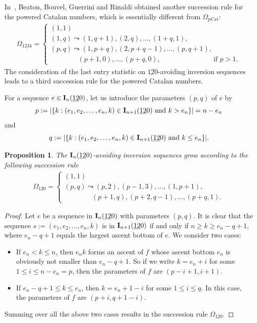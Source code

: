 \documentclass[12pt,A4]{amsart}
\numberwithin{equation}{section}
\theoremstyle{plain}
\newtheorem{proposition}[theorem]{Proposition}
\theoremstyle{definition}
\def\I{\operatorname{{\bf I}}}
\begin{document}
In~\cite[Prop.~25]{bbgr}, Beaton, Bouvel, Guerrini and Rinaldi obtained another succession rule for the powered Catalan numbers, which is essentially different from $\Omega_{\mathrm{pCat}}$:
\begin{align*}
\Omega_{\mathrm{1\underline{23}4}}=\begin{cases}
(1,1) \\
(1,q) \leadsto (1,q+1), (2,q),\ldots,(1+q,1),\\
(p,q)\leadsto (1,p+q), (2,p+q-1),\ldots,(p,q+1),\\
\qquad\qquad (p+1,0),\dots,(p+q,0),\qquad\qquad\qquad\,\,\,\,\quad\text{if $p>1$}.
\end{cases}
\end{align*} 
The consideration of the last entry statistic on $\underline{12}0$-avoiding inversion sequences leads to a third succession rule for the powered Catalan numbers. 

For a sequence $e\in\I_n(\underline{12}0)$, let us introduce the parameters $(p,q)$ of $e$ by 
$$
p:=|\{k: (e_1,e_2,\ldots,e_n,k)\in\I_{n+1}(\underline{12}0)\text{ and } k>e_n\}|=n-e_n
$$
and 
$$
q:=|\{k: (e_1,e_2,\ldots,e_n,k)\in\I_{n+1}(\underline{12}0) \text{ and } k\leq e_n\}|.
$$

\begin{proposition}\label{succ:3}
The $\I_n(\underline{12}0)$-avoiding inversion sequences grow according to the following succession rule 
\begin{align*}
\Omega_{\mathrm{\underline{12}0}}=\begin{cases}
(1,1) \\
(p,q)\leadsto (p,2), (p-1,3),\ldots,(1,p+1),\\
\qquad\qquad (p+1,q),(p+2,q-1), \dots, (p+q,1).
\end{cases}
\end{align*}
\end{proposition}
\begin{proof}
Let $e$ be a sequence in $\I_n(\underline{12}0)$ with parameters $(p,q)$. It is clear that the sequence $s:=(e_1,e_2,\ldots,e_n,k)$ is in $\I_{n+1}(\underline{12}0)$ if and only if $n\geq k\geq e_n-q+1$, where $e_n-q+1$ equals the largest ascent bottom of $e$. We consider two cases:
\begin{itemize}
\item If $e_n<k\leq n$, then $e_n k$ forms an ascent of $f$ whose ascent bottom $e_n$ is obviously not smaller than $e_n-q+1$. So if we write $k=e_n+i$ for some $1\leq i\leq n-e_n=p$, then the parameters of $f$ are $(p-i+1,i+1)$. 
\item If $e_n-q+1\leq k\leq e_n$, then $k=e_n+1-i$ for some $1\leq i\leq q$. In this case, the parameters of $f$ are $(p+i,q+1-i)$. 
\end{itemize}
Summing over all the above two cases results in the succession rule $\Omega_{\mathrm{\underline{12}0}}$.
\end{proof}
\end{document}
